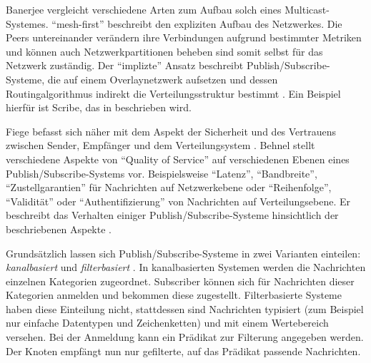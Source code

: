 Banerjee vergleicht verschiedene Arten zum Aufbau solch eines Multicast-Systemes. \enquote{mesh-first} beschreibt den expliziten Aufbau des Netzwerkes. Die Peers untereinander verändern ihre Verbindungen aufgrund bestimmter Metriken und können auch Netzwerkpartitionen beheben sind somit selbst für das Netzwerk zuständig. Der \enquote{implizte} Ansatz beschreibt Publish/Subscribe-Systeme, die auf einem Overlaynetzwerk aufsetzen und dessen Routingalgorithmus indirekt die Verteilungsstruktur bestimmt \cite{Banerjee2001Comparative}. Ein Beispiel hierfür ist Scribe, das in  beschrieben wird.

Fiege befasst sich näher mit dem Aspekt der Sicherheit und des Vertrauens zwischen Sender, Empfänger und dem Verteilungsystem \cite{FiegeSecurity}. Behnel stellt verschiedene Aspekte von \enquote{Quality of Service} auf verschiedenen Ebenen eines Publish/Sub\-scribe-Systems vor. Beispielsweise \enquote{Latenz}, \enquote{Bandbreite}, \enquote{Zustellgarantien} für Nachrichten auf Netzwerkebene oder \enquote{Reihenfolge}, \enquote{Validität} oder \enquote{Authentifizierung} von Nachrichten auf Verteilungsebene. Er beschreibt das Verhalten einiger Publish/Subscribe-Systeme hinsichtlich der beschriebenen Aspekte \cite{BeFiMu2006PubSubQoS}. 

Grundsätzlich lassen sich Publish/Subscribe-Systeme in zwei Varianten einteilen: \emph{kanalbasiert} und \emph{filterbasiert} \cite{Liu2003Survey}. In kanalbasierten Systemen werden die Nachrichten einzelnen Kategorien zugeordnet. Subscriber können sich für Nachrichten dieser Kategorien anmelden und bekommen diese zugestellt. Filterbasierte Systeme haben diese Einteilung nicht, stattdessen sind Nachrichten typisiert (zum Beispiel nur einfache Datentypen und Zeichenketten) und mit einem Wertebereich versehen. Bei der Anmeldung kann ein Prädikat zur Filterung angegeben werden. Der Knoten empfängt nun nur gefilterte, auf das Prädikat passende Nachrichten.

